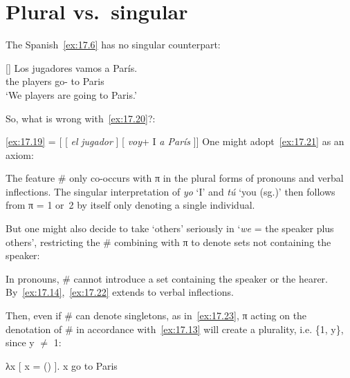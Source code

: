 \documentclass[output=paper]{langsci/langscibook}
\begin{document}
\section{Plural vs.\ singular}\label{sec:17.4}

The Spanish~\eqref{ex:17.6} has no singular counterpart:

\begin{exe}
\exi{\eqref{ex:17.6}}[]{
    \gll    Los jugadores vamos a París.\\
            the players      go-\Fpl{} to Paris\\
    \glt    ‘We players are going to Paris.’}
\label{ex:17.19}
\end{exe}
So, what is wrong with~\eqref{ex:17.20}?:

\ea\label{ex:17.20}
    \eqref{ex:17.19} = [ [ \emph{el}\tss{\#} \emph{jugador} ] [ \emph{voy}+ I\tss{\#} \emph{a París} ]]
\z
One might adopt~\eqref{ex:17.21} as an axiom:

\ea\label{ex:17.21}
    The feature \# only co-occurs with π in the plural forms of pronouns
    and verbal inflections.
\z
The singular interpretation of \emph{yo} ‘I’ and \emph{tú} ‘you (sg.)’ then
follows from π = 1 or~2 by itself only denoting a single individual.

But one might also decide to take ‘others’ seriously in ‘\emph{we} = the
speaker plus others’, restricting the \# combining with π to denote sets not
containing the speaker:

\ea\label{ex:17.22}
    In pronouns, \# cannot introduce a set containing the speaker or the hearer.
\z
By~\eqref{ex:17.14},~\eqref{ex:17.22} extends to verbal inflections.

Then, even if \# can denote singletons, as in~\eqref{ex:17.23}, π acting on
the denotation of \# in accordance with~\eqref{ex:17.13} will create a
plurality, i.e. \{1, y\}, since y ${\neq}$ 1:

\ea\label{ex:17.23}
    λx [ x = () ]. x go to Paris\\
\z
\end{document}
